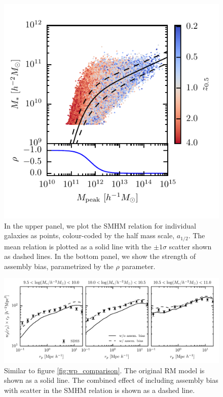 \documentclass[a4paper,fleqn,usenatbib]{mnras}
\begin{document}
\begin{figure}
    \includegraphics{figures/smhm_assem_bias.pdf}
    \caption{In the upper panel, we plot the SMHM relation for individual galaxies as points, colour-coded by the half mass scale, $a_{1/2}$.  The mean relation is plotted as a solid line with the $\pm 1\sigma$ scatter shown as dashed lines.  In the bottom panel, we show the strength of assembly bias, parametrized by the $\rho$ parameter.}
    \label{fig:assem_bias_smhm}
\end{figure} 

\begin{figure}
    \includegraphics{figures/wp_comparison_assem_bias.pdf}
    \caption{Similar to figure \ref{fig:wp_comparison}.  The original RM model is shown as a solid line.  The combined effect of including assembly bias with scatter in the SMHM relation is shown as a dashed line.}
    \label{fig:wp_comparison_assem_bias}
\end{figure}
\end{document}
